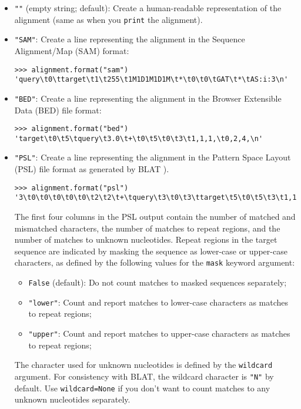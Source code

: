 \begin{itemize}
\item \verb+""+ (empty string; default): Create a human-readable representation of the alignment (same as when you \verb+print+ the alignment).
\item \verb+"SAM"+: Create a line representing the alignment in the Sequence Alignment/Map (SAM) format:
\begin{verbatim}
>>> alignment.format("sam")
'query\t0\ttarget\t1\t255\t1M1D1M1D1M\t*\t0\t0\tGAT\t*\tAS:i:3\n'
\end{verbatim}
\item \verb+"BED"+: Create a line representing the alignment in the Browser Extensible Data (BED) file format:
\begin{verbatim}
>>> alignment.format("bed")
'target\t0\t5\tquery\t3.0\t+\t0\t5\t0\t3\t1,1,1,\t0,2,4,\n'
\end{verbatim}
\item \verb+"PSL"+: Create a line representing the alignment in the Pattern Space Layout (PSL) file format as generated by BLAT \cite{kent2002}).
\begin{verbatim}
>>> alignment.format("psl")
'3\t0\t0\t0\t0\t0\t2\t2\t+\tquery\t3\t0\t3\ttarget\t5\t0\t5\t3\t1,1,1,\t0,1,2,\t0,2,4,\n'
\end{verbatim}
The first four columns in the PSL output contain the number of matched and mismatched characters, the number of matches to repeat regions, and the number of matches to unknown nucleotides.
Repeat regions in the target sequence are indicated by masking the sequence as lower-case or upper-case characters, as defined by the following values for the \verb+mask+ keyword argument:
\begin{itemize}
\item \verb+False+ (default): Do not count matches to masked sequences separately;
\item \verb+"lower"+: Count and report matches to lower-case characters as matches to repeat regions;
\item \verb+"upper"+: Count and report matches to upper-case characters as matches to repeat regions;
\end{itemize}
The character used for unknown nucleotides is defined by the \verb+wildcard+ argument. For consistency with BLAT, the wildcard character is \verb+"N"+ by default. Use \verb+wildcard=None+ if you don't want to count matches to any unknown nucleotides separately.
\begin{verbatim}

\end{verbatim}
\end{itemize}
